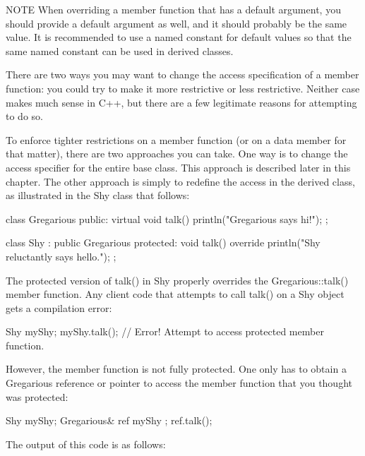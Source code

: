 \begin{myNotic}{NOTE}
When overriding a member function that has a default argument, you should provide a default argument as well, and it should probably be the same value. It is recommended to use a named constant for default values so that the same named constant can be used in derived classes.
\end{myNotic}


There are two ways you may want to change the access specification of a member function: you could try to make it more restrictive or less restrictive. Neither case makes much sense in C++, but there are a few legitimate reasons for attempting to do so.

To enforce tighter restrictions on a member function (or on a data member for that matter), there are two approaches you can take. One way is to change the access specifier for the entire base class. This approach is described later in this chapter. The other approach is simply to redefine the access in the derived class, as illustrated in the Shy class that follows:

\begin{cpp}
class Gregarious
{
    public:
        virtual void talk() { println("Gregarious says hi!"); }
};

class Shy : public Gregarious
{
    protected:
        void talk() override { println("Shy reluctantly says hello."); }
};
\end{cpp}

The protected version of talk() in Shy properly overrides the Gregarious::talk() member function. Any client code that attempts to call talk() on a Shy object gets a compilation error:

\begin{cpp}
Shy myShy;
myShy.talk(); // Error! Attempt to access protected member function.
\end{cpp}

However, the member function is not fully protected. One only has to obtain a Gregarious reference or pointer to access the member function that you thought was protected:

\begin{cpp}
Shy myShy;
Gregarious& ref { myShy };
ref.talk();
\end{cpp}

The output of this code is as follows:

